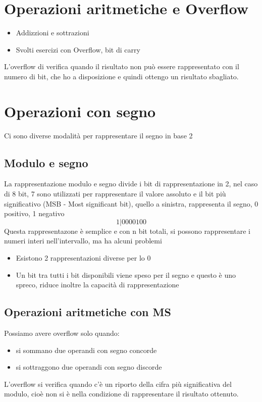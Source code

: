 \documentclass[12pt, a4paper, openany]{book}
\begin{document}
\section{Operazioni aritmetiche e Overflow}
\begin{itemize}
    \item Addizzioni e sottrazioni
    \item Svolti esercizi con Overflow, bit di carry
\end{itemize}
 L'overflow di verifica quando il risultato non può essere rappresentato con il numero di bit,
 che ho a disposizione e quindi ottengo un risultato sbagliato.
\section{Operazioni con segno}
Ci sono diverse modalità per rappresentare il segno in base 2
\subsection{Modulo e segno}
La rappresentazione modulo e segno divide i bit di rappresentazione in 2, nel caso di 8 bit, 7 sono utilizzati per rappresentare il valore assoluto e il bit
più significativo (MSB - Most significant bit), quello a sinistra, rappresenta il segno, 0 positivo, 1 negativo
\begin{equation}
    1 | 0 0 0 0 1 0 0
\end{equation}
Questa rappresentazone è semplice e con n bit totali, si possono rappresentare i numeri interi nell'intervallo, ma ha alcuni problemi
\begin{itemize}
    \item Esistono 2 rappresentazioni diverse per lo 0
    \item Un bit tra tutti i bit disponibili viene speso per il segno e questo è uno spreco, riduce inoltre la capacità di rappresentazione
\end{itemize}

\subsection{Operazioni aritmetiche con MS}
Possiamo avere overflow solo quando:
\begin{itemize}
    \item si sommano due operandi con segno concorde
    \item si sottraggono due operandi con segno discorde
\end{itemize}
L'overflow si verifica quando c'è un riporto della cifra più significativa del modulo, cioè non si è nella
condizione di rappresentare il risultato ottenuto.
\end{document}
